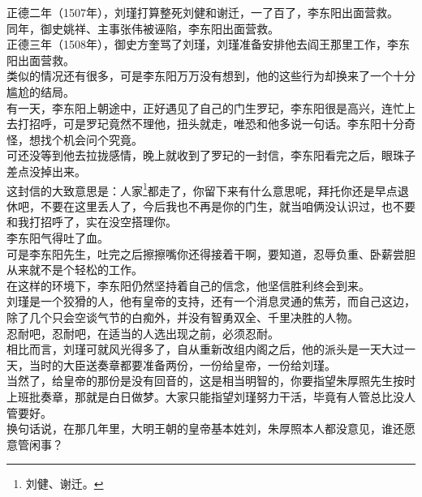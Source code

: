 \begin{multicols}{\theparacolNo}
正德二年（1507年），刘瑾打算整死刘健和谢迁，一了百了，李东阳出面营救。\\

同年，御史姚祥、主事张伟被诬陷，李东阳出面营救。\\

正德三年（1508年），御史方奎骂了刘瑾，刘瑾准备安排他去阎王那里工作，李东阳出面营救。\\

类似的情况还有很多，可是李东阳万万没有想到，他的这些行为却换来了一个十分尴尬的结局。\\

有一天，李东阳上朝途中，正好遇见了自己的门生罗玘，李东阳很是高兴，连忙上去打招呼，可是罗玘竟然不理他，扭头就走，唯恐和他多说一句话。李东阳十分奇怪，想找个机会问个究竟。\\

可还没等到他去拉拢感情，晚上就收到了罗玘的一封信，李东阳看完之后，眼珠子差点没掉出来。\\

这封信的大致意思是：人家\footnote{刘健、谢迁。}都走了，你留下来有什么意思呢，拜托你还是早点退休吧，不要在这里丢人了，今后我也不再是你的门生，就当咱俩没认识过，也不要和我打招呼了，实在没空搭理你。\\

李东阳气得吐了血。\\

可是李东阳先生，吐完之后擦擦嘴你还得接着干啊，要知道，忍辱负重、卧薪尝胆从来就不是个轻松的工作。\\

在这样的环境下，李东阳仍然坚持着自己的信念，他坚信胜利终会到来。\\

刘瑾是一个狡猾的人，他有皇帝的支持，还有一个消息灵通的焦芳，而自己这边，除了几个只会空谈气节的白痴外，并没有智勇双全、千里决胜的人物。\\

忍耐吧，忍耐吧，在适当的人选出现之前，必须忍耐。\\

相比而言，刘瑾可就风光得多了，自从重新改组内阁之后，他的派头是一天大过一天，当时的大臣送奏章都要准备两份，一份给皇帝，一份给刘瑾。\\

当然了，给皇帝的那份是没有回音的，这是相当明智的，你要指望朱厚照先生按时上班批奏章，那就是白日做梦。大家只能指望刘瑾努力干活，毕竟有人管总比没人管要好。\\

换句话说，在那几年里，大明王朝的皇帝基本姓刘，朱厚照本人都没意见，谁还愿意管闲事？\\


\end{multicols}
